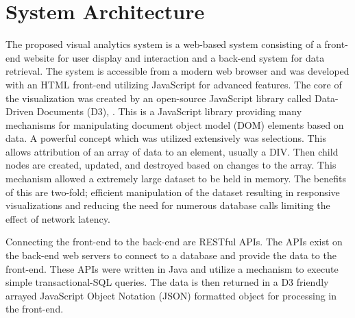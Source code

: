 	\section{System Architecture}
		The proposed visual analytics system is a web-based system consisting of a front-end website for user display and interaction and a back-end system for data retrieval. The system is accessible from a modern web browser and was developed with an HTML front-end utilizing JavaScript for advanced features. The core of the visualization was created by an open-source JavaScript library called Data-Driven Documents (D3), \citep{d3}. This is a JavaScript library providing many mechanisms for manipulating document object model (DOM) elements based on data. A powerful concept which was utilized extensively was selections. This allows attribution of an array of data to an element, usually a DIV. Then child nodes are created, updated, and destroyed based on changes to the array. This mechanism allowed a extremely large dataset to be held in memory. The benefits of this are two-fold; efficient manipulation of the dataset resulting in responsive visualizations and reducing the need for numerous database calls limiting the effect of network latency.\par
		Connecting the front-end to the back-end are RESTful APIs. The APIs exist on the back-end web servers to connect to a database and provide the data to the front-end. These APIs were written in Java and utilize a mechanism to execute simple transactional-SQL queries. The data is then returned in a D3 friendly arrayed JavaScript Object Notation (JSON) formatted object for processing in the front-end.\par
